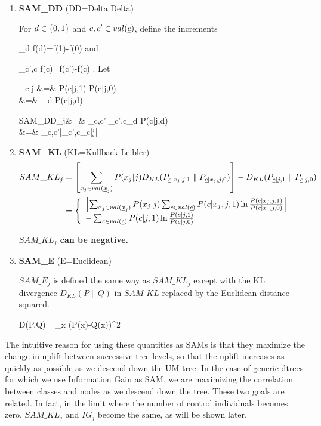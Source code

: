 \documentclass[12pt]{report}
\begin{document}
\begin{enumerate}
\item{\bf SAM\_DD} (DD=Delta Delta)

For $d\in \{0,1\}$
and $c, c'\in val(\rvc)$, define the increments

\beq
\partial_d f(d)=f(1)-f(0)
\eeq
and

\beq
\partial_{c',c} f(c)=f(c')-f(c)
\;.
\eeq
Let

\beqa
\Delta_{c|j} &=& P(c|j,1)-P(c|j,0)
\\
&=& \partial_d P(c|j,d)
\label{eq-delta-c-j}
\eeqa

\beqa
SAM\_DD_j&=& \max_{c,c'}|\partial_{c',c}\partial_d P(c|j,d)|
\\
&=&
\max_{c,c'}|\partial_{c',c}\Delta_{c|j}|
\eeqa

\item{\bf SAM\_KL} (KL=Kullback Leibler)
\begin{align}
SAM\_KL_j&=
\left[
\sum_{x_j\in val(\rvx_j)}
P(x_j|j)
D_{KL}(P_{\rvc|x_j,j,1}\parallel P_{\rvc|x_j,j,0})
\right]
-
D_{KL}(P_{\rvc|j,1}\parallel P_{\rvc|j,0})
\\
&=\left\{\begin{array}{l}
\left[
\sum_{x_j\in val(\rvx_j)}
P(x_j|j)
 \sum_{c\in val(\rvc)}P(c|x_j,j,1)
\ln \frac{P(c|x_j,j,1) }{ P(c|x_j,j,0) }
\right]
\\
-
\sum_{c\in val(\rvc)}
P(c|j,1)
\ln \frac{P(c|j,1) }{ P(c|j,0) }
\end{array}
\right.
\label{eq-sam-kl}
\end{align}

{\bf $SAM\_KL_j$ can be negative.}

\item {\bf SAM\_E} (E=Euclidean)

$SAM\_E_j$ is defined the same way as $SAM\_KL_j$
except with
the KL divergence $D_{KL}(P\parallel Q)$
in $SAM\_KL$ replaced
by the Euclidean distance squared.


\beq
D(P,Q) =\sum_x (P(x)-Q(x))^2
\eeq

\end{enumerate}

The intuitive reason for
 using these quantities as
SAMs is that they maximize the change in uplift
between
successive tree levels, so
that the uplift increases as quickly as possible
as we descend down the UM tree.
In the case of generic dtrees
for which we use Information Gain as SAM, we
are maximizing the correlation
between classes and nodes as we descend down the tree.
These two goals are related.
In fact, in the limit
where the
number of control individuals
becomes zero,
$SAM\_KL_j$ and $IG_j$
become the same, as will be shown later.
\end{document}
